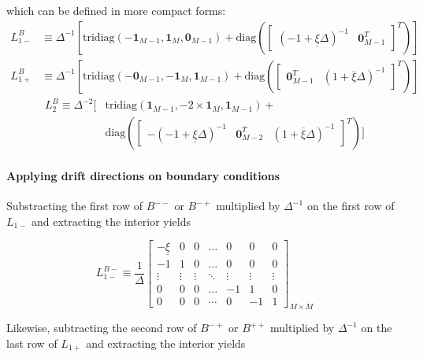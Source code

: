 \documentclass[11pt]{article}
\newcommand{\diag}{\ensuremath{\mathrm{diag}}}
\theoremstyle{definition}
\begin{document}
which can be defined in more compact forms:
\begin{align}
L_{1-}^B &\equiv \Delta^{-1}
\left[ 
\text{tridiag}(-\mathbf{1}_{M-1}, 
\mathbf{1}_{M}, \mathbf{0}_{M-1} ) + \diag \left( \begin{bmatrix}
(-1+\underline{\xi} \Delta)^{-1} &
\mathbf{0}_{M-1}^T 
\end{bmatrix}^T
\right)
\right]
\end{align}
\begin{align}
L_{1+}^B &\equiv 
\Delta^{-1}
\left[ 
\text{tridiag}(-\mathbf{0}_{M-1}, 
\mathbf{-1}_{M}, \mathbf{1}_{M-1} ) + \diag \left( \begin{bmatrix}
\mathbf{0}_{M-1}^T &
(1+\overline{\xi} \Delta)^{-1}
\end{bmatrix}^T
\right)
\right]
\end{align}
\begin{align}
L_2^B \equiv  \Delta^{-2} 
\Big[ 
&\text{tridiag}(
\mathbf{1}_{M-1},
-2 \times \mathbf{1}_M,
\mathbf{1}_{M-1} )
+ \\
&\diag \left( \begin{bmatrix}
-(-1+\underline{\xi} \Delta)^{-1}&
\mathbf{0}_{M-2}^T &
(1+\overline{\xi} \Delta)^{-1}
\end{bmatrix}^T \right)
\Big]
\end{align}

\paragraph{Applying drift directions on boundary conditions}
Substracting the first row of $B^{--}$ or $B^{-+}$ multiplied by $\Delta^{-1}$ on the first row of $L_{1-}$ and extracting the interior yields

\begin{equation}
L_{1-}^{B-} \equiv \frac{1}{\Delta}\begin{bmatrix}
-\underline{\xi} &0&0&\dots&0&0&0\\
-1&1&0&\dots&0&0&0\\
\vdots&\vdots&\vdots&\ddots&\vdots&\vdots&\vdots\\
0&0&0&\dots&-1&1&0\\
0&0&0&\cdots&0&-1&1
\end{bmatrix}_{M\times M} \label{eq:L-1-regular-left}
\end{equation}

Likewise, subtracting the second row of $B^{-+}$ or $B^{++}$ multiplied by $\Delta^{-1}$ on the last row of $L_{1+}$ and extracting the interior yields
\end{document}
